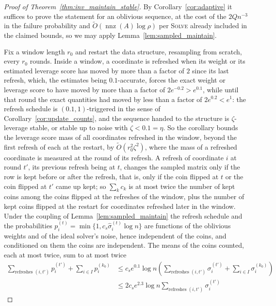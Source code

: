 \documentclass[11pt]{article}
\newcommand{\nnz}{\operatorname{nnz}}
\renewcommand{\O}{\widetilde O}
\begin{document}
\begin{proof}[Proof of Theorem~\ref{thm:inv_maintain_stable}]
By Corollary~\ref{cor:adaptive} it suffices to prove the statement for an
oblivious sequence, at the cost of the $2 Q n^{-3}$ in the failure probability
and $\O(\nnz(A) \log \rho)$ per \textsc{Solve} already included in the claimed
bounds, so we may apply Lemma~\ref{lem:sampled_maintain}.

Fix a window length $r_0$ and restart the data structure, resampling from
scratch, every $r_0$ rounds.
Inside a window, a coordinate is refreshed when its weight or its estimated
leverage score has moved by more than a factor of $2$ since its last refresh,
which, the estimates being $0.1$-accurate, forces the exact weight or leverage
score to have moved by more than a factor of $2 e^{-0.2} > e^{0.1}$, while until
that round the exact quantities had moved by less than a factor of
$2 e^{0.2} < e^{1}$: the refresh schedule is
$(0.1, 1)$-triggered in the sense of Corollary~\ref{cor:update_counts}, and the
sequence handed to the structure is $\zeta$-leverage stable, or stable up to
noise with $\zeta < 0.1 = \eta$.
So the corollary bounds the leverage score mass of all coordinates refreshed in
the window, beyond the first refresh of each at the restart, by
$\O(r_0^{2} \zeta^{2})$, where the mass of a refreshed coordinate is measured at
the round of its refresh.
A refresh of coordinate $i$ at round
$t'$, its previous refresh being at
$t$, changes the sampled matrix only if the row is kept before or after the
refresh, that is, only if the coin flipped at $t$ or the coin flipped at
$t'$ came up kept; so
$\sum_k c_k$ is at most twice the number of kept coins among the coins flipped
at the refreshes of the window, plus the number of kept coins flipped at the
restart for coordinates refreshed later in the window.
Under the coupling of Lemma~\ref{lem:sampled_maintain} the refresh schedule and
the probabilities $p^{(t)}_i = \min\{1, c_s \widehat{\sigma}^{(t)}_i \log n\}$
are functions of the oblivious weights and of the ideal solver's noise, hence
independent of the coins, and conditioned on them the coins are independent.
The means of the coins counted, each at most twice, sum to at most twice
\begin{align*}
\sum_{\text{refreshes } (i, t')} p^{(t')}_i
+ \sum_{i \in I} p^{(k_0)}_i
&\le
c_s e^{0.1} \log n
\left(
\sum_{\text{refreshes } (i, t')} \sigma^{(t')}_i
+ \sum_{i \in I} \sigma^{(k_0)}_i
\right)
\\
&\le
2 c_s e^{2.3} \log n
\sum_{\text{refreshes } (i, t')} \sigma^{(t')}_i

\end{align*}
\end{proof}
\end{document}
